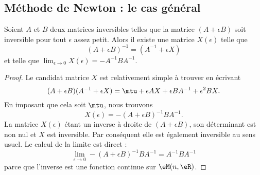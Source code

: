 \subsection{Méthode de Newton : le cas général}

\begin{lemma}       \label{LemXdObnV}
    Soient \( A\) et \( B\) deux matrices inversibles telles que la matrice \( (A+\epsilon B)\) soit inversible pour tout \( \epsilon\) assez petit. Alors il existe une matrice \( X(\epsilon)\) telle que
    \begin{equation}
        (A+\epsilon B)^{-1}=(A^{-1}+\epsilon X)
    \end{equation}
    et telle que \( \lim_{\epsilon\to 0}X(\epsilon)=-A^{-1} BA^{-1}\).
\end{lemma}

\begin{proof}
    Le candidat matrice \( X\) est relativement simple à trouver en écrivant
    \begin{equation}
        (A+\epsilon B)(A^{-1}+\epsilon X)=\mtu+\epsilon AX+\epsilon BA^{-1}+\epsilon^2BX.
    \end{equation}
    En imposant que cela soit \( \mtu\), nous trouvons
    \begin{equation}
        X(\epsilon)=-(A+\epsilon B)^{-1} BA^{-1}.
    \end{equation}
    La matrice \( X(\epsilon)\) étant un inverse à droite de \( (A+\epsilon B)\), son déterminant est non nul et \( X\) est inversible. Par conséquent elle est également inversible au sens usuel. Le calcul de la limite est direct :
    \begin{equation}
        \lim_{\epsilon\to 0}-(A+\epsilon B)^{-1} BA^{-1}=A^{-1} BA^{-1}
    \end{equation}
    parce que l'inverse est une fonction continue sur \( \eM(n,\eR)\).
\end{proof}


